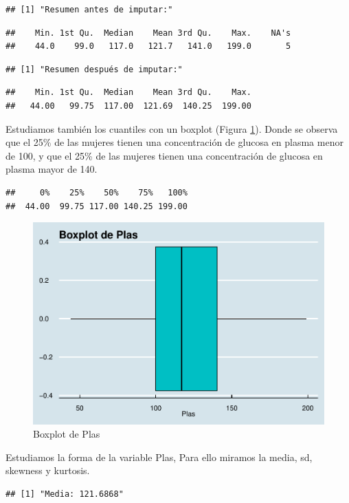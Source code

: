 \documentclass[
]{article}
\begin{document}
\begin{verbatim}
## [1] "Resumen antes de imputar:"
\end{verbatim}

\begin{verbatim}
##    Min. 1st Qu.  Median    Mean 3rd Qu.    Max.    NA's 
##    44.0    99.0   117.0   121.7   141.0   199.0       5
\end{verbatim}

\begin{verbatim}
## [1] "Resumen después de imputar:"
\end{verbatim}

\begin{verbatim}
##    Min. 1st Qu.  Median    Mean 3rd Qu.    Max. 
##   44.00   99.75  117.00  121.69  140.25  199.00
\end{verbatim}

Estudiamos también los cuantiles con un boxplot (Figura
\ref{fig:box_plas}). Donde se observa que el 25\% de las mujeres tienen
una concentración de glucosa en plasma menor de 100, y que el 25\% de
las mujeres tienen una concentración de glucosa en plasma mayor de 140.

\begin{verbatim}
##     0%    25%    50%    75%   100% 
##  44.00  99.75 117.00 140.25 199.00
\end{verbatim}

\begin{figure}

{\centering \includegraphics[width=0.5\linewidth]{pima-clasificacion_files/figure-latex/box_plas-1} 

}

\caption{Boxplot de Plas}\label{fig:box_plas}
\end{figure}

Estudiamos la forma de la variable Plas, Para ello miramos la media, sd,
skewness y kurtosis.

\begin{verbatim}
## [1] "Media: 121.6868"
\end{verbatim}
\end{document}
